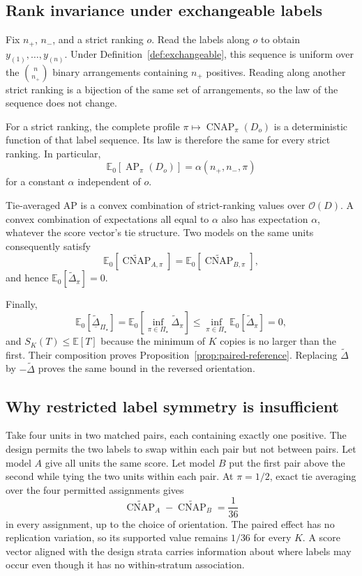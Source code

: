 \documentclass[11pt]{article}
\newcommand{\AP}{\operatorname{AP}}
\newcommand{\CNAP}{\operatorname{CNAP}}
\newcommand{\PSet}{\Pi_\star}
\newcommand{\E}{\mathbb{E}}
\newcommand{\CNAPta}{\widetilde{\CNAP}}
\newcommand{\Dta}{\widetilde{\Delta}}
\newcommand{\RobDta}{\underline{\widetilde{\Delta}}_{\PSet}}
\theoremstyle{remark}
\begin{document}
\subsection{Rank invariance under exchangeable labels}

Fix $n_+$, $n_-$, and a strict ranking $o$. Read the labels along $o$ to obtain $y_{(1)},\ldots,y_{(n)}$. Under Definition~\ref{def:exchangeable}, this sequence is uniform over the $\binom n{n_+}$ binary arrangements containing $n_+$ positives. Reading along another strict ranking is a bijection of the same set of arrangements, so the law of the sequence does not change.

For a strict ranking, the complete profile $\pi\mapsto\CNAP_\pi(D_o)$ is a deterministic function of that label sequence. Its law is therefore the same for every strict ranking. In particular,
\[
\E_0[\AP_\pi(D_o)]
=
\alpha(n_+,n_-,\pi)
\]
for a constant $\alpha$ independent of $o$.

Tie-averaged AP is a convex combination of strict-ranking values over $\mathcal O(D)$. A convex combination of expectations all equal to $\alpha$ also has expectation $\alpha$, whatever the score vector's tie structure. Two models on the same units consequently satisfy
\[
\E_0[\CNAPta_{A,\pi}]
=
\E_0[\CNAPta_{B,\pi}],
\]
and hence $\E_0[\Dta_\pi]=0$.

Finally,
\[
\E_0[\RobDta]
=
\E_0\left[\inf_{\pi\in\PSet}\Dta_\pi\right]
\leq
\inf_{\pi\in\PSet}\E_0[\Dta_\pi]
=0,
\]
and $S_K(T)\leq\E[T]$ because the minimum of $K$ copies is no larger than the first. Their composition proves Proposition~\ref{prop:paired-reference}. Replacing $\Dta$ by $-\Dta$ proves the same bound in the reversed orientation.

\subsection{Why restricted label symmetry is insufficient}

Take four units in two matched pairs, each containing exactly one positive. The design permits the two labels to swap within each pair but not between pairs. Let model $A$ give all units the same score. Let model $B$ put the first pair above the second while tying the two units within each pair. At $\pi=1/2$, exact tie averaging over the four permitted assignments gives
\[
\CNAPta_A-\CNAPta_B
=
\frac1{36}
\]
in every assignment, up to the choice of orientation. The paired effect has no replication variation, so its supported value remains $1/36$ for every $K$. A score vector aligned with the design strata carries information about where labels may occur even though it has no within-stratum association.
\end{document}
